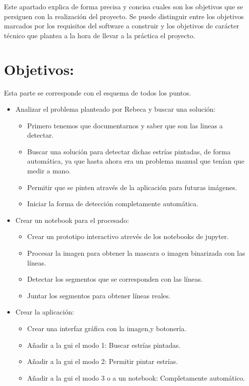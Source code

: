 
Este apartado explica de forma precisa y concisa cuales son los objetivos que se persiguen con la realización del proyecto. Se puede distinguir entre los objetivos marcados por los requisitos del software a construir y los objetivos de carácter técnico que plantea a la hora de llevar a la práctica el proyecto.

\section{Objetivos:}
Esta parte se corresponde con el esquema de todos los puntos.
\begin{itemize}
\item Analizar el problema planteado por Rebeca y buscar una solución:
	\begin{itemize}
		\item Primero tenemos que documentarnos y saber que son las lineas a detectar.
		\item Buscar una solución para detectar dichas estrías pintadas, de forma automática, ya que hasta ahora era un problema manual que tenían que medir a mano.
		\item Permitir que se pinten através de la aplicación para futuras imágenes.
		\item Iniciar la forma de detección completamente automática.
	\end{itemize}
\item Crear un notebook para el procesado:
	\begin{itemize}
		\item Crear un prototipo interactivo atrevés de los notebooks de jupyter.
		\item Procesar la imagen para obtener la mascara o imagen binarizada con las líneas.
		\item Detectar los segmentos que se corresponden con las líneas.
		\item Juntar los segmentos para obtener líneas reales.
	\end{itemize}
\item Crear la aplicación:
	\begin{itemize}
		\item Crear una interfaz gráfica con la imagen,y botonería.
		\item Añadir a la gui el modo 1: Buscar estrías pintadas.
		\item Añadir a la gui el modo 2: Permitir pintar estrías.
		\item Añadir a la gui el modo 3 o a un notebook: Completamente automático.
	\end{itemize}
\end{itemize}

